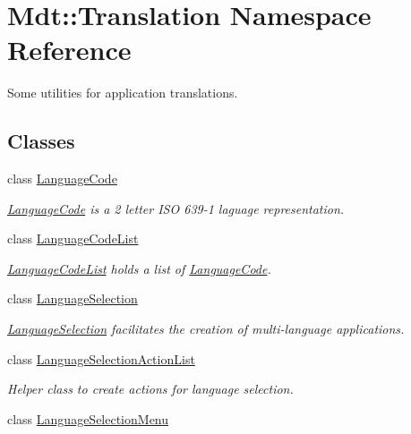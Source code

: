 \hypertarget{namespace_mdt_1_1_translation}{}\section{Mdt\+:\+:Translation Namespace Reference}
\label{namespace_mdt_1_1_translation}


Some utilities for application translations.  


\subsection*{Classes}
\begin{DoxyCompactItemize}
\item 
class \hyperlink{class_mdt_1_1_translation_1_1_language_code}{Language\+Code}
\begin{DoxyCompactList}\small\item\em \hyperlink{class_mdt_1_1_translation_1_1_language_code}{Language\+Code} is a 2 letter I\+SO 639-\/1 laguage representation. \end{DoxyCompactList}\item 
class \hyperlink{class_mdt_1_1_translation_1_1_language_code_list}{Language\+Code\+List}
\begin{DoxyCompactList}\small\item\em \hyperlink{class_mdt_1_1_translation_1_1_language_code_list}{Language\+Code\+List} holds a list of \hyperlink{class_mdt_1_1_translation_1_1_language_code}{Language\+Code}. \end{DoxyCompactList}\item 
class \hyperlink{class_mdt_1_1_translation_1_1_language_selection}{Language\+Selection}
\begin{DoxyCompactList}\small\item\em \hyperlink{class_mdt_1_1_translation_1_1_language_selection}{Language\+Selection} facilitates the creation of multi-\/language applications. \end{DoxyCompactList}\item 
class \hyperlink{class_mdt_1_1_translation_1_1_language_selection_action_list}{Language\+Selection\+Action\+List}
\begin{DoxyCompactList}\small\item\em Helper class to create actions for language selection. \end{DoxyCompactList}\item 
class \hyperlink{class_mdt_1_1_translation_1_1_language_selection_menu}{Language\+Selection\+Menu}

\end{DoxyCompactItemize}
